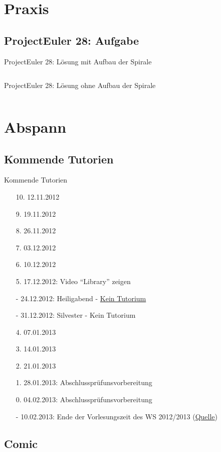 \documentclass[usepdftitle=false,hyperref={pdfpagelabels=false}]{beamer}
\begin{document}
\section{Praxis}
\subsection{ProjectEuler 28: Aufgabe}

\begin{frame}{ProjectEuler 28: Lösung mit Aufbau der Spirale}
    \inputminted[linenos=true, numbersep=5pt, tabsize=4, fontsize=\tiny, label=Euler28.java, frame=lines]{java}{Euler28.java}
\end{frame}

\begin{frame}{ProjectEuler 28: Lösung ohne Aufbau der Spirale}
    \inputminted[linenos=true, numbersep=5pt, tabsize=4, fontsize=\tiny, label=Euler28.java, frame=lines]{java}{Euler28-fast.java}
\end{frame}

\section{Abspann}
\subsection{Kommende Tutorien}
\begin{frame}{Kommende Tutorien}
  \begin{itemize}
    \item[10.] 12.11.2012
    \item[9.] 19.11.2012
    \item[8.] 26.11.2012
    \item[7.] 03.12.2012
    \item[6.] 10.12.2012
    \item[5.] 17.12.2012: Video "`Library"' zeigen
    \item[-] 24.12.2012: Heiligabend - \href{http://www.fmc.uni-karlsruhe.de/faq/wann-sind-die-weihnachtsferien}{Kein Tutorium}
    \item[-] 31.12.2012: Silvester - Kein Tutorium
    \item[4.] 07.01.2013
    \item[3.] 14.01.2013
    \item[2.] 21.01.2013
    \item[1.] 28.01.2013: Abschlussprüfunsvorbereitung
    \item[0.] 04.02.2013: Abschlussprüfunsvorbereitung
    \item[-] 10.02.2013: Ende der Vorlesungszeit des WS 2012/2013 (\href{http://www.kit.edu/studieren/2873.php}{Quelle})
  \end{itemize}
\end{frame}

\subsection{Comic}
\end{document}
